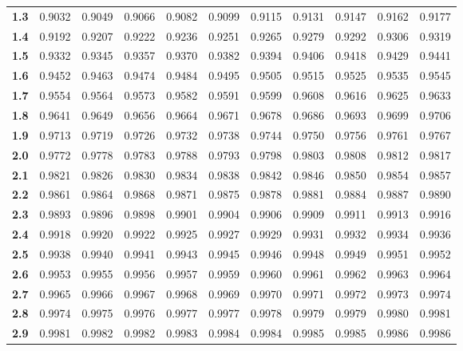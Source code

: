 \begin{center}
\begin{tabular}{c|c|c|c|c|c|c|c|c|c|c}
\textbf{1.3} & 0.9032  & 0.9049  & 0.9066  & 0.9082  & 0.9099  & 0.9115  & 0.9131  & 0.9147  & 0.9162  & 0.9177  \\
\textbf{1.4 }& 0.9192  & 0.9207  & 0.9222  & 0.9236  & 0.9251  & 0.9265  & 0.9279  & 0.9292  & 0.9306  & 0.9319  \\
\textbf{1.5} & 0.9332  & 0.9345  & 0.9357  & 0.9370  & 0.9382  & 0.9394  & 0.9406  & 0.9418  & 0.9429  & 0.9441  \\
\textbf{1.6} & 0.9452  & 0.9463  & 0.9474  & 0.9484  & 0.9495  & 0.9505  & 0.9515  & 0.9525  & 0.9535  & 0.9545  \\
\textbf{1.7} & 0.9554  & 0.9564  & 0.9573  & 0.9582  & 0.9591  & 0.9599  & 0.9608  & 0.9616  & 0.9625  & 0.9633  \\
\textbf{1.8 }& 0.9641  & 0.9649  & 0.9656  & 0.9664  & 0.9671  & 0.9678  & 0.9686  & 0.9693  & 0.9699  & 0.9706  \\
\textbf{1.9} & 0.9713  & 0.9719  & 0.9726  & 0.9732  & 0.9738  & 0.9744  & 0.9750  & 0.9756  & 0.9761  & 0.9767  \\
\textbf{2.0} & 0.9772  & 0.9778  & 0.9783  & 0.9788  & 0.9793  & 0.9798  & 0.9803  & 0.9808  & 0.9812  & 0.9817  \\
\textbf{2.1} & 0.9821  & 0.9826  & 0.9830  & 0.9834  & 0.9838  & 0.9842  & 0.9846  & 0.9850  & 0.9854  & 0.9857  \\
\textbf{2.2} & 0.9861  & 0.9864  & 0.9868  & 0.9871  & 0.9875  & 0.9878  & 0.9881  & 0.9884  & 0.9887  & 0.9890  \\
\textbf{2.3} & 0.9893  & 0.9896  & 0.9898  & 0.9901  & 0.9904  & 0.9906  & 0.9909  & 0.9911  & 0.9913  & 0.9916  \\
\textbf{2.4} & 0.9918  & 0.9920  & 0.9922  & 0.9925  & 0.9927  & 0.9929  & 0.9931  & 0.9932  & 0.9934  & 0.9936  \\
\textbf{2.5} & 0.9938  & 0.9940  & 0.9941  & 0.9943  & 0.9945  & 0.9946  & 0.9948  & 0.9949  & 0.9951  & 0.9952  \\
\textbf{2.6} & 0.9953  & 0.9955  & 0.9956  & 0.9957  & 0.9959  & 0.9960  & 0.9961  & 0.9962  & 0.9963  & 0.9964  \\
\textbf{2.7} & 0.9965  & 0.9966  & 0.9967  & 0.9968  & 0.9969  & 0.9970  & 0.9971  & 0.9972  & 0.9973  & 0.9974  \\
\textbf{2.8} & 0.9974  & 0.9975  & 0.9976  & 0.9977  & 0.9977  & 0.9978  & 0.9979  & 0.9979  & 0.9980  & 0.9981  \\
\textbf{2.9} & 0.9981  & 0.9982  & 0.9982  & 0.9983  & 0.9984  & 0.9984  & 0.9985  & 0.9985  & 0.9986  & 0.9986  \\

\end{tabular}
\end{center}
